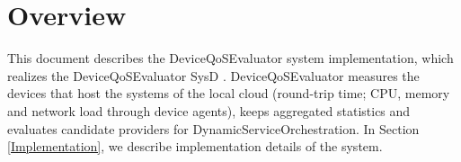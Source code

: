 \documentclass[a4paper]{arrowhead}
\begin{document}
\sloppy

\ArrowheadSetup

\begin{center}
  \vspace*{1cm}
  \huge{\arrowtitle}

  \vspace*{0.2cm}
  \LARGE{\arrowtype}
  \vspace*{1cm}

  \vspace*{\fill}


  \vspace*{1cm}
  \vspace*{\fill}

  \begin{abstract}
    This document describes the design and implementation of the DeviceQoSEvaluator support system of Arrowhead 5.2.2 (\texttt{ah5-DeviceQoSEvaluator-java-spring}).
  \end{abstract}

  \vspace*{1cm}
\end{center}

\newpage

\tableofcontents
\newpage

\section{Overview}
\label{sec:overview}

This document describes the DeviceQoSEvaluator system implementation, which realizes the DeviceQoSEvaluator SysD \cite{dqe-sysd}. Device\allowbreak{}Qo\allowbreak{}SEvaluator measures the devices that host the systems of the local cloud (round-trip time; CPU, memory and network load through device agents), keeps aggregated statistics and evaluates candidate providers for Dynamic\allowbreak{}Service\allowbreak{}Orchestration.
In Section \ref{Implementation}, we describe implementation details of the system.

\newpage
\end{document}
